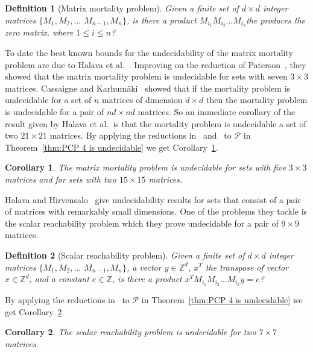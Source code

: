 \documentclass[11pt]{article} \usepackage{amsfonts,amsmath,amssymb,amsthm}
\newtheorem{corollary}{Corollary}
\newtheorem{definition}{Definition}
\newcommand{\PCPfour}{\mathcal{P}}\newcommand{\CTS}{\mathcal{C}}\newcommand{\CTSp}{\mathcal{C'}}\newcommand{\TSTC}{\mathcal{T_{\CTS}}}\newcommand{\TSTCp}{\mathcal{T'_{\CTS}}}\def\Nset{\mathbb{N}}\def\Zset{\mathbb{Z}}\def\Qset{\mathbb{Q}}
\begin{document}
\begin{definition}[Matrix mortality problem]
Given a finite set of $d\times d$ integer matrices $\{M_1,M_2,\ldots$ $M_{n-1},M_n\}$, is there a product $M_{i_1}M_{i_2}\ldots M_{i_k}$the produces the zero matrix, where $1\leqslant i\leqslant n$? 
\end{definition}

To date the best known bounds for the undecidability of the matrix mortality problem are due to Halava et al.~\cite{Halava2007}. Improving on the reduction of Paterson~\cite{Paterson1970}, they showed that the matrix mortality problem is undecidable for sets with seven $3\times 3$ matrices. 
Cassaigne and Karhum\"{a}ki~\cite{Cassaigne1998} showed that if the mortality problem is undecidable for a set of $n$ matrices of dimension $d\times d$ then the mortality problem is undecidable for a pair of $nd\times nd$ matrices. 
So an immediate corollary of the result given by Halava et al.~is that the mortality problem is undecidable a set of two $ 21\times 21$ matrices.
By applying the reductions in~\cite{Halava2001} and~\cite{Cassaigne1998} to $\PCPfour$ in Theorem~\ref{thm:PCP 4 is undecidable} we get Corollary~\ref{cor:matrix mortality}.
\begin{corollary}\label{cor:matrix mortality}
The matrix mortality problem is undecidable for sets with five $3\times 3$ matrices and for sets with two $ 15\times 15$ matrices. 
\end{corollary}

Halava and Hirvensalo~\cite{Halava2007A} give undecidability results for sets that consist of a pair of matrices with remarkably small dimensions. 
One of the problems they tackle is the scalar reachability problem which they prove undecidable for a pair of $9\times 9$ matrices.
\begin{definition}[Scalar reachability problem]
Given a finite set of $d\times d$ integer matrices $\{M_1,M_2,\ldots$ $M_{ n-1},M_n\}$, a vector $y\in\Zset^d$, $x^T$ the transpose of vector $x\in\Zset^d$, and a constant $e\in\Zset$, is there a product $x^TM_{i_1}M_{i_2}\ldots M_{i_k}y=e$? 
\end{definition}
By applying the reductions in~\cite{Halava2007A} to $\PCPfour$ in Theorem~\ref{thm:PCP 4 is undecidable} we get Corollary~\ref{cor:scalar reachability}.
\begin{corollary}\label{cor:scalar reachability}
The scalar reachability problem is undecidable for two $7\times 7$ matrices. 
\end{corollary}
\end{document}
